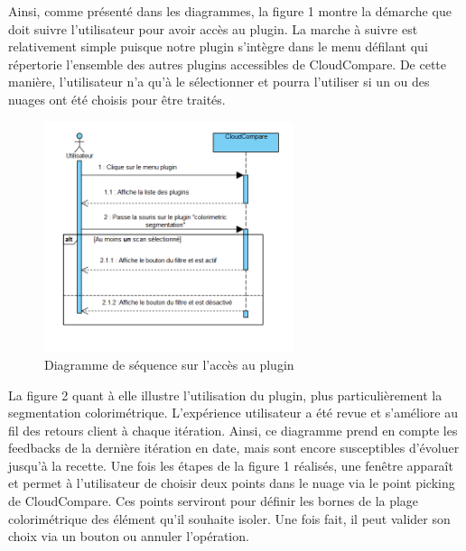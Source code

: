 \documentclass[12pt,titlepage,french]{article}
\begin{document}
Ainsi, comme présenté dans les diagrammes, la figure 1 montre la démarche que doit suivre l'utilisateur pour avoir accès au plugin. La marche à suivre est relativement simple puisque notre plugin s'intègre dans le menu défilant qui répertorie l'ensemble des autres plugins accessibles de CloudCompare. De cette manière, l'utilisateur n'a qu'à le sélectionner et pourra l'utiliser si un ou des nuages ont été choisis pour être traités.
\begin{figure}[!hbtp]
\center
\includegraphics[width=0.65\textwidth]{./img/sequDiagPlugin.PNG}
    \caption{\label{} Diagramme de séquence sur l'accès au plugin}
\end{figure}
\newline

La figure 2 quant à elle illustre l'utilisation du plugin, plus particulièrement la segmentation colorimétrique. L'expérience utilisateur a été revue et s'améliore au fil des retours client à chaque itération. Ainsi, ce diagramme prend en compte les feedbacks de la dernière itération en date, mais sont encore susceptibles d'évoluer jusqu'à la recette. Une fois les étapes de la figure 1 réalisés, une fenêtre apparaît et permet à l'utilisateur de choisir deux points dans le nuage via le point picking de CloudCompare. Ces points serviront pour définir les bornes de la plage colorimétrique des élément qu'il souhaite isoler. Une fois fait, il peut valider son choix via un bouton ou annuler l'opération.
\end{document}
